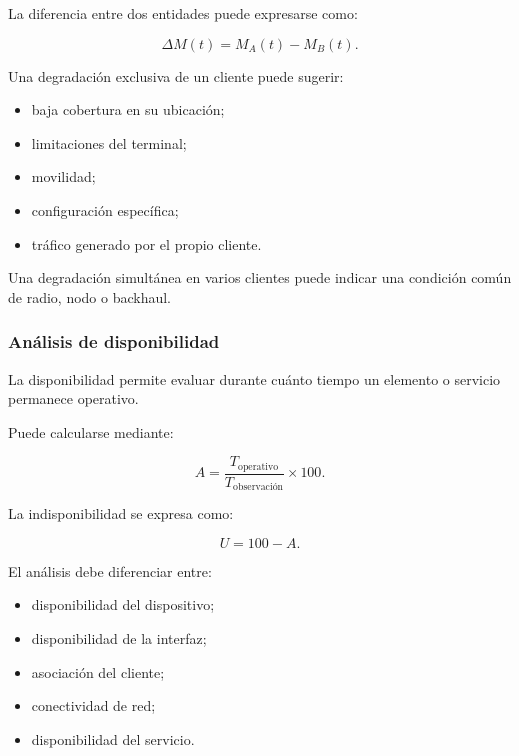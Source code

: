 La diferencia entre dos entidades puede expresarse como:

\[
    \Delta M(t)
    =
    M_A(t)
    -
    M_B(t).
\]

Una degradación exclusiva de un cliente puede sugerir:

\begin{itemize}
    \item baja cobertura en su ubicación;

    \item limitaciones del terminal;

    \item movilidad;

    \item configuración específica;

    \item tráfico generado por el propio cliente.
\end{itemize}

Una degradación simultánea en varios clientes puede indicar una condición
común de radio, nodo o backhaul.


\subsubsection*{Análisis de disponibilidad}

La disponibilidad permite evaluar durante cuánto tiempo un elemento o
servicio permanece operativo.

Puede calcularse mediante:

\[
    A
    =
    \frac{
        T_{\mathrm{operativo}}
    }{
        T_{\mathrm{observación}}
    }
    \times
    100.
\]

La indisponibilidad se expresa como:

\[
    U
    =
    100-A.
\]

El análisis debe diferenciar entre:

\begin{itemize}
    \item disponibilidad del dispositivo;

    \item disponibilidad de la interfaz;

    \item asociación del cliente;

    \item conectividad de red;

    \item disponibilidad del servicio.
\end{itemize}

